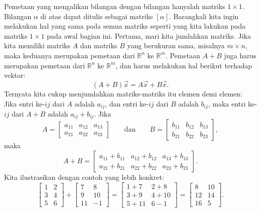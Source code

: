 Pemetaan yang mengalikan bilangan dengan bilangan hanyalah matriks $1 \times 1$.
Bilangan $\alpha$ di atas dapat ditulis sebagai matriks $[\alpha]$.
Barangkali kita ingin melakukan hal yang sama pada semua matriks seperti yang
kita lakukan pada matriks $1 \times 1$ pada awal bagian ini.
Pertama, mari kita jumlahkan matriks.
Jika kita memiliki matriks $A$ dan matriks $B$ yang berukuran sama,
misalnya $m \times n$, maka keduanya merupakan pemetaan dari
${\mathbb{R}}^n$ ke ${\mathbb{R}}^m$. Pemetaan $A+B$ juga harus merupakan pemetaan dari
${\mathbb{R}}^n$ ke ${\mathbb{R}}^m$, dan harus melakukan hal berikut terhadap
vektor:
\begin{equation*}
(A+B) \vec{x} = A\vec{x} + B \vec{x} .
\end{equation*}
Ternyata kita cukup menjumlahkan matriks-matriks itu elemen demi elemen: Jika
entri ke-$ij$ dari $A$ adalah $a_{ij}$, dan
entri ke-$ij$ dari $B$ adalah $b_{ij}$, maka
entri ke-$ij$ dari $A+B$ adalah $a_{ij} + b_{ij}$. Jika
\begin{equation*}
A =
\begin{bmatrix}
a_{11} & a_{12} & a_{13}  \\
a_{21} & a_{22} & a_{23}
\end{bmatrix}
\qquad \text{dan} \qquad
B =
\begin{bmatrix}
b_{11} & b_{12} & b_{13}  \\
b_{21} & b_{22} & b_{23}
\end{bmatrix} ,
\end{equation*}
maka
\begin{equation*}
A+B =
\begin{bmatrix}
a_{11} + b_{11} & a_{12} + b_{12} & a_{13} + b_{13}  \\
a_{21} + b_{21} & a_{22} + b_{22} & a_{23} + b_{23}
\end{bmatrix} .
\end{equation*}
Kita ilustrasikan dengan contoh yang lebih konkret:
\begin{equation*}
\begin{bmatrix}
1 & 2 \\
3 & 4 \\
5 & 6
\end{bmatrix}
+
\begin{bmatrix}
7 & 8 \\
9 & 10 \\
11 & -1
\end{bmatrix}
=
\begin{bmatrix}
1+7 & 2+8 \\
3+9 & 4+10 \\
5+11 & 6-1
\end{bmatrix}
=
\begin{bmatrix}
8 & 10 \\
12 & 14 \\
16 & 5
\end{bmatrix} .
\end{equation*}
